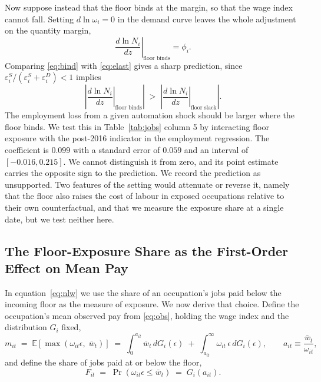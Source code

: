 \documentclass[12pt,leqno]{article}
\begin{document}
Now suppose instead that the floor binds at the margin, so that the wage index cannot fall. Setting $d \ln \omega_i = 0$ in the demand curve leaves the whole adjustment on the quantity margin,
\begin{equation}\label{eq:bind}
\left.\frac{d \ln N_i}{dz}\right|_{\text{floor binds}} = \phi_i .
\end{equation}
Comparing \eqref{eq:bind} with \eqref{eq:elast} gives a sharp prediction, since $\varepsilon^{S}_i / (\varepsilon^{S}_i + \varepsilon^{D}_i) < 1$ implies
\begin{equation}
\left| \left.\frac{d \ln N_i}{dz}\right|_{\text{floor binds}} \right| \; > \; \left| \left.\frac{d \ln N_i}{dz}\right|_{\text{floor slack}} \right| .
\end{equation}
The employment loss from a given automation shock should be larger where the floor binds. We test this in Table~\ref{tab:jobs} column 5 by interacting floor exposure with the post-2016 indicator in the employment regression. The coefficient is $0.099$ with a standard error of $0.059$ and an interval of $[-0.016, 0.215]$. We cannot distinguish it from zero, and its point estimate carries the opposite sign to the prediction. We record the prediction as unsupported. Two features of the setting would attenuate or reverse it, namely that the floor also raises the cost of labour in exposed occupations relative to their own counterfactual, and that we measure the exposure share at a single date, but we test neither here.

\subsection{The Floor-Exposure Share as the First-Order Effect on Mean Pay}

In equation~\eqref{eq:nlw} we use the share of an occupation's jobs paid below the incoming floor as the measure of exposure. We now derive that choice. Define the occupation's mean observed pay from \eqref{eq:obs}, holding the wage index and the distribution $G_i$ fixed,
\begin{equation}\label{eq:mdef}
m_{it} \;=\; \mathbb{E}\!\left[\max\!\left(\omega_{it}\epsilon,\; \bar{w}_t\right)\right]
\;=\; \int_{0}^{a_{it}} \bar{w}_t \, dG_i(\epsilon) \;+\; \int_{a_{it}}^{\infty} \omega_{it}\,\epsilon \, dG_i(\epsilon),
\qquad a_{it} \equiv \frac{\bar{w}_t}{\omega_{it}},
\end{equation}
and define the share of jobs paid at or below the floor,
\begin{equation}\label{eq:Fdef}
F_{it} \;=\; \Pr\!\left(\omega_{it}\epsilon \leq \bar{w}_t\right) \;=\; G_i\!\left(a_{it}\right).
\end{equation}
\end{document}
